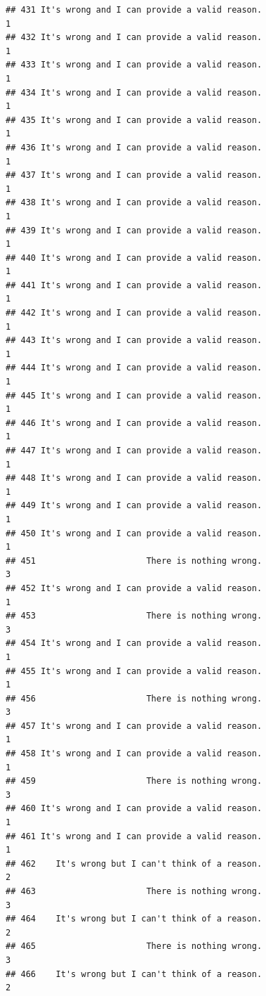 \documentclass[
  american,
  man,floatsintext]{apa7}
\begin{document}
\begin{verbatim}
## 431 It's wrong and I can provide a valid reason.                    1
## 432 It's wrong and I can provide a valid reason.                    1
## 433 It's wrong and I can provide a valid reason.                    1
## 434 It's wrong and I can provide a valid reason.                    1
## 435 It's wrong and I can provide a valid reason.                    1
## 436 It's wrong and I can provide a valid reason.                    1
## 437 It's wrong and I can provide a valid reason.                    1
## 438 It's wrong and I can provide a valid reason.                    1
## 439 It's wrong and I can provide a valid reason.                    1
## 440 It's wrong and I can provide a valid reason.                    1
## 441 It's wrong and I can provide a valid reason.                    1
## 442 It's wrong and I can provide a valid reason.                    1
## 443 It's wrong and I can provide a valid reason.                    1
## 444 It's wrong and I can provide a valid reason.                    1
## 445 It's wrong and I can provide a valid reason.                    1
## 446 It's wrong and I can provide a valid reason.                    1
## 447 It's wrong and I can provide a valid reason.                    1
## 448 It's wrong and I can provide a valid reason.                    1
## 449 It's wrong and I can provide a valid reason.                    1
## 450 It's wrong and I can provide a valid reason.                    1
## 451                      There is nothing wrong.                    3
## 452 It's wrong and I can provide a valid reason.                    1
## 453                      There is nothing wrong.                    3
## 454 It's wrong and I can provide a valid reason.                    1
## 455 It's wrong and I can provide a valid reason.                    1
## 456                      There is nothing wrong.                    3
## 457 It's wrong and I can provide a valid reason.                    1
## 458 It's wrong and I can provide a valid reason.                    1
## 459                      There is nothing wrong.                    3
## 460 It's wrong and I can provide a valid reason.                    1
## 461 It's wrong and I can provide a valid reason.                    1
## 462    It's wrong but I can't think of a reason.                    2
## 463                      There is nothing wrong.                    3
## 464    It's wrong but I can't think of a reason.                    2
## 465                      There is nothing wrong.                    3
## 466    It's wrong but I can't think of a reason.                    2

\end{verbatim}
\end{document}
